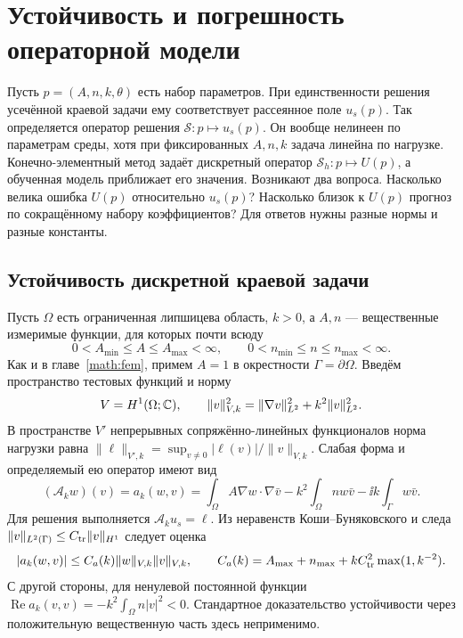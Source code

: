 \chapter{Устойчивость и погрешность операторной модели}
\label{rig:chapter}
\label{op:chapter}

Пусть $p=(A,n,k,\theta)$ есть набор параметров. При единственности
решения усечённой краевой задачи ему соответствует рассеянное поле
$u_s(p)$. Так определяется оператор решения $\mathcal S:p\mapsto u_s(p)$.
Он вообще нелинеен по параметрам среды, хотя при фиксированных $A,n,k$
задача линейна по нагрузке. Конечно-элементный метод задаёт дискретный
оператор $\mathcal S_h:p\mapsto U(p)$, а обученная модель приближает
его значения. Возникают два вопроса. Насколько велика ошибка $U(p)$
относительно $u_s(p)$? Насколько близок к $U(p)$ прогноз по сокращённому
набору коэффициентов? Для ответов нужны разные нормы и разные константы.

\section{Устойчивость дискретной краевой задачи}
\label{rig:spaces}
\label{rig:discrete}

Пусть $\Omega$ есть ограниченная липшицева область, $k>0$, а $A,n$ ---
вещественные измеримые функции, для которых почти всюду
\begin{equation}
 0<A_{\min}\le A\le A_{\max}<\infty,\qquad
 0<n_{\min}\le n\le n_{\max}<\infty.\label{rig:coeff-bounds}
\end{equation}
Как и в главе~\ref{math:fem}, примем $A=1$ в окрестности
$\Gamma=\partial\Omega$. Введём пространство тестовых функций и норму
\begin{equation}
 V=H^1(\Omega;\mathbb{C}),\qquad \|v\|_{V,k}^2=\|\nabla v\|_{L^2}^2+k^2\|v\|_{L^2}^2.
 \label{rig:vnorm}
\end{equation}
В пространстве $V'$ непрерывных сопряжённо-линейных функционалов
норма нагрузки равна $\|\ell\|_{V',k}=\sup_{v\ne0}|\ell(v)|/\|v\|_{V,k}$.
Слабая форма и определяемый ею оператор имеют вид
\begin{equation}
 (\mathcal A_k w)(v)=a_k(w,v)
 =\int_\Omega A\nabla w\cdot\nabla\bar v
 -k^2\int_\Omega nw\bar v-\ii k\int_\Gamma w\bar v.\label{rig:form}
\end{equation}
Для решения выполняется $\mathcal A_k u_s=\ell$. Из неравенств
Коши--Буняковского и следа $\|v\|_{L^2(\Gamma)}\le C_{\rm tr}\|v\|_{H^1}$
следует оценка
\begin{equation}
 |a_k(w,v)|\le C_a(k)\|w\|_{V,k}\|v\|_{V,k},\qquad
 C_a(k)=A_{\max}+n_{\max}+k C_{\rm tr}^2\max(1,k^{-2}).\label{rig:continuity}
\end{equation}
С другой стороны, для ненулевой постоянной функции
$\operatorname{Re}a_k(v,v)=-k^2\int_\Omega n|v|^2<0$. Стандартное
доказательство устойчивости через положительную вещественную часть
здесь неприменимо.

